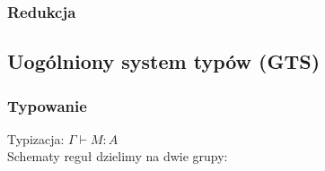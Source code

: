   \subsubsection{Redukcja}
\subsection{Uogólniony system typów (GTS)}
  \subsubsection{Typowanie}
  Typizacja: \(\Gamma \vdash M : A\)\\

  Schematy reguł dzielimy na dwie grupy:


